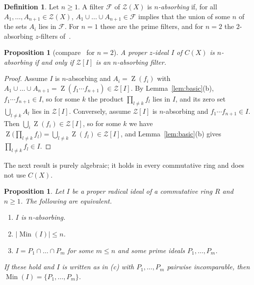 \documentclass[11pt]{amsart}
\newtheorem{proposition}[theorem]{Proposition}
\theoremstyle{definition}
\newtheorem{definition}[theorem]{Definition}
\theoremstyle{remark}
\DeclareMathOperator{\Min}{Min}
\DeclareMathOperator{\Z}{Z}
\newcommand{\CZ}{\mathcal Z}
\newcommand{\F}{\mathcal F}
\begin{document}
\begin{definition}
Let $n\ge1$. A filter $\F$ of $\CZ(X)$ is \emph{$n$-absorbing} if, for
all $A_1,\dots,A_{n+1}\in\CZ(X)$, $A_1\cup\dots\cup A_{n+1}\in\F$
implies that the union of some $n$ of the sets $A_i$ lies in $\F$.
For $n=1$ these are the prime filters, and for $n=2$ the
$2$-absorbing $z$-filters of~\cite{BilginDemirOral}.
\end{definition}

\begin{proposition}[{compare~\cite{BilginDemirOral} for $n=2$}]
\label{prop:zero-set}
A proper $z$-ideal $I$ of $C(X)$ is $n$-absorbing if and only if
$\CZ[I]$ is an $n$-absorbing filter.
\end{proposition}

\begin{proof}
Assume $I$ is $n$-absorbing and
$A_i=\Z(f_i)$ with $A_1\cup\dots\cup A_{n+1}=\Z(f_1\cdots f_{n+1})\in\CZ[I]$.
By Lemma~\ref{lem:basic}(b), $f_1\cdots f_{n+1}\in I$, so for some $k$
the product $\prod_{l\ne k}f_l$ lies in $I$, and its zero set
$\bigcup_{l\ne k}A_l$ lies in $\CZ[I]$.
Conversely, assume $\CZ[I]$ is $n$-absorbing and
$f_1\cdots f_{n+1}\in I$. Then $\bigcup_i\Z(f_i)\in\CZ[I]$, so for some
$k$ we have $\Z\bigl(\prod_{l\ne k}f_l\bigr)=\bigcup_{l\ne k}\Z(f_l)\in\CZ[I]$,
and Lemma~\ref{lem:basic}(b) gives $\prod_{l\ne k}f_l\in I$.
\end{proof}

The next result is purely algebraic; it holds in every commutative ring
and does not use $C(X)$.

\begin{proposition}
\label{prop:radical}
Let $I$ be a proper radical ideal of a commutative ring $R$ and
$n\ge1$. The following are equivalent.
\begin{enumerate}[label=\textup{(\alph*)}]
\item $I$ is $n$-absorbing.
\item $|\Min(I)|\le n$.
\item $I=P_1\cap\dots\cap P_m$ for some $m\le n$ and some prime ideals
$P_1,\dots,P_m$.
\end{enumerate}
If these hold and $I$ is written as in \textup{(c)} with
$P_1,\dots,P_m$ pairwise incomparable, then $\Min(I)=\{P_1,\dots,P_m\}$.
\end{proposition}
\end{document}
